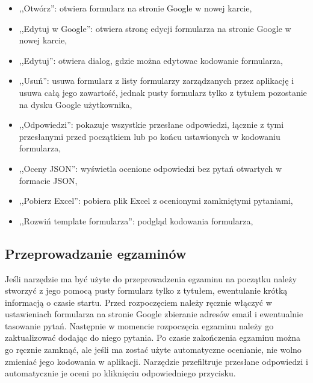 \begin{itemize}
  \item ,,Otwórz'': otwiera formularz na stronie Google w nowej karcie,
  \item ,,Edytuj w Google'': otwiera stronę edycji formularza na stronie Google
    w nowej karcie,
  \item ,,Edytuj'': otwiera dialog, gdzie można edytowac kodowanie formularza,
  \item ,,Usuń'': usuwa formularz z listy formularzy zarządzanych przez aplikację
    i usuwa całą jego zawartość, jednak pusty formularz tylko z tytułem pozostanie 
    na dysku Google użytkownika,
  \item ,,Odpowiedzi'': pokazuje wszystkie przesłane odpowiedzi, łącznie z tymi
    przesłanymi przed początkiem lub po końcu ustawionych w kodowaniu formularza,
  \item ,,Oceny JSON'': wyświetla ocenione odpowiedzi bez pytań otwartych w formacie
    JSON,
  \item ,,Pobierz Excel'': pobiera plik Excel z ocenionymi zamkniętymi pytaniami,
  \item ,,Rozwiń template formularza'': podgląd kodowania formularza,
\end{itemize}

\subsection{Przeprowadzanie egzaminów}
Jeśli narzędzie ma być użyte do przeprowadzenia egzaminu na początku należy stworzyć
z jego pomocą pusty formularz tylko z tytułem, ewentulanie krótką informacją o czasie
startu. Przed rozpoczęciem należy ręcznie włączyć w ustawieniach formularza na stronie
Google zbieranie adresów email i ewentualnie tasowanie pytań. Następnie w momencie
rozpoczęcia egzaminu należy go zaktualizować dodając do niego pytania.
Po czasie zakończenia egzaminu można go ręcznie zamknąć, ale jeśli ma zostać użyte
automatyczne ocenianie, nie wolno zmieniać jego kodowania w aplikacji. Narzędzie
przefiltruje przesłane odpowiedzi i automatycznie je oceni po kliknięciu
odpowiedniego przycisku.

